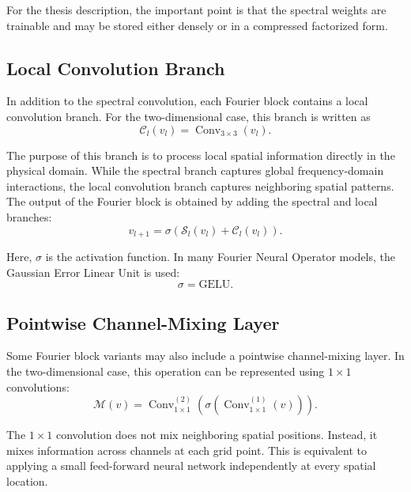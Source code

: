 For the thesis description, the important point is that the spectral weights are trainable and may be stored either densely or in a compressed factorized form.


\subsection{Local Convolution Branch}

In addition to the spectral convolution, each Fourier block contains a local convolution branch. For the two-dimensional case, this branch is written as
\begin{equation}
\mathcal{C}_l(v_l)
=
\operatorname{Conv}_{3 \times 3}(v_l).
\end{equation}

The purpose of this branch is to process local spatial information directly in the physical domain. While the spectral branch captures global frequency-domain interactions, the local convolution branch captures neighboring spatial patterns. The output of the Fourier block is obtained by adding the spectral and local branches:
\begin{equation}
v_{l+1}
=
\sigma
\left(
\mathcal{S}_l(v_l)
+
\mathcal{C}_l(v_l)
\right).
\end{equation}

Here, \(\sigma\) is the activation function. In many Fourier Neural Operator models, the Gaussian Error Linear Unit is used:
\begin{equation}
\sigma = \mathrm{GELU}.
\end{equation}

\subsection{Pointwise Channel-Mixing Layer}

Some Fourier block variants may also include a pointwise channel-mixing layer. In the two-dimensional case, this operation can be represented using \(1 \times 1\) convolutions:
\begin{equation}
\mathcal{M}(v)
=
\operatorname{Conv}_{1 \times 1}^{(2)}
\left(
\sigma
\left(
\operatorname{Conv}_{1 \times 1}^{(1)}(v)
\right)
\right).
\end{equation}

The \(1 \times 1\) convolution does not mix neighboring spatial positions. Instead, it mixes information across channels at each grid point. This is equivalent to applying a small feed-forward neural network independently at every spatial location.

